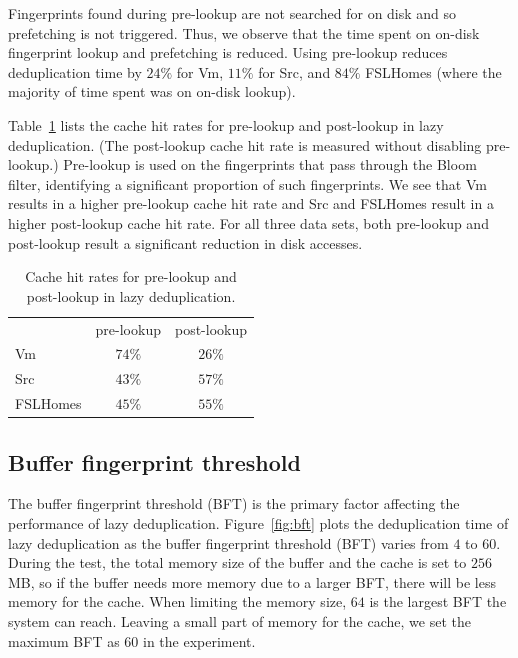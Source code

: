 \documentclass[prodmode,acmtecs]{acmsmall}
\begin{document}
Fingerprints found during pre-lookup are not searched for on disk and so prefetching is not triggered.  Thus, we observe that the time spent on on-disk fingerprint lookup and prefetching is reduced.  Using pre-lookup reduces deduplication time by $24\%$ for Vm, $11\%$ for Src, and $84\%$ FSLHomes (where the majority of time spent was on on-disk lookup).

Table~\ref{tab:hit-rate} lists the cache hit rates for pre-lookup and post-lookup in lazy deduplication.  (The post-lookup cache hit rate is measured without disabling pre-lookup.) Pre-lookup is used on the fingerprints that pass through the Bloom filter, identifying a significant proportion of such fingerprints.  We see that Vm results in a higher pre-lookup cache hit rate and Src and FSLHomes result in a higher post-lookup cache hit rate.  For all three data sets, both pre-lookup and post-lookup result a significant reduction in disk accesses.

\begin{table}[htbp]
\centering
\begin{tabular}{lcc}
\toprule
& pre-lookup & post-lookup \\
\cmidrule(lr){2-2}\cmidrule(lr){3-3}
Vm & $ 74\%$ & $26\%$ \\
Src & $43\%$ & $57\%$ \\
FSLHomes & $45\%$ & $55\%$ \\
\bottomrule
\end{tabular}
\caption{Cache hit rates for pre-lookup and post-lookup in lazy deduplication.}
\label{tab:hit-rate}
\end{table}

\subsection{Buffer fingerprint threshold}

The buffer fingerprint threshold (BFT) is the primary factor affecting the performance of lazy deduplication. Figure~\ref{fig:bft} plots the deduplication time of lazy deduplication as the buffer fingerprint threshold (BFT) varies from $4$ to $60$. During the test, the total memory size of the buffer and the cache is set to $256$MB, so if the buffer needs more memory due to a larger BFT, there will be less memory for the cache. When limiting the memory size, $64$ is the largest BFT the system can reach. Leaving a small part of memory for the cache, we set the maximum BFT as 60 in the experiment.
\end{document}
